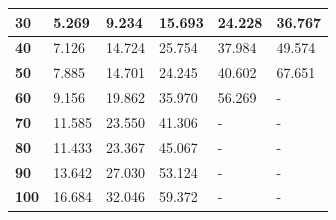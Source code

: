 \begin{table}[H]
\begin{tabular}{|l|l|l|l|l|l|}
\textbf{30}                               & 5.269           & 9.234            & 15.693           & 24.228           & 36.767           \\ \hline
\textbf{40}                               & 7.126           & 14.724           & 25.754           & 37.984           & 49.574           \\ \hline
\textbf{50}                               & 7.885           & 14.701           & 24.245           & 40.602           & 67.651           \\ \hline
\textbf{60}                               & 9.156           & 19.862           & 35.970           & 56.269           & -                \\ \hline
\textbf{70}                               & 11.585          & 23.550           & 41.306           & -                & -                \\ \hline
\textbf{80}                               & 11.433          & 23.367           & 45.067           & -                & -                \\ \hline
\textbf{90}                               & 13.642          & 27.030           & 53.124           & -                & -                \\ \hline
\textbf{100}                              & 16.684          & 32.046           & 59.372           & -                & -                \\ \hline
\end{tabular}
\end{table}

